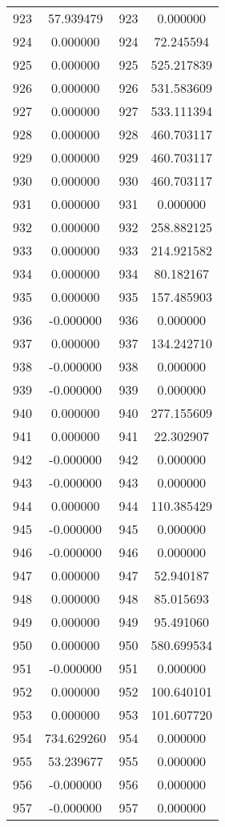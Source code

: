 \documentclass[12pt]{article}
\begin{document}
\begin{longtable}{@{}cccc@{}}
923 & 57.939479 & 923 & 0.000000 \\
924 & 0.000000 & 924 & 72.245594 \\
925 & 0.000000 & 925 & 525.217839 \\
926 & 0.000000 & 926 & 531.583609 \\
927 & 0.000000 & 927 & 533.111394 \\
928 & 0.000000 & 928 & 460.703117 \\
929 & 0.000000 & 929 & 460.703117 \\
930 & 0.000000 & 930 & 460.703117 \\
931 & 0.000000 & 931 & 0.000000 \\
932 & 0.000000 & 932 & 258.882125 \\
933 & 0.000000 & 933 & 214.921582 \\
934 & 0.000000 & 934 & 80.182167 \\
935 & 0.000000 & 935 & 157.485903 \\
936 & -0.000000 & 936 & 0.000000 \\
937 & 0.000000 & 937 & 134.242710 \\
938 & -0.000000 & 938 & 0.000000 \\
939 & -0.000000 & 939 & 0.000000 \\
940 & 0.000000 & 940 & 277.155609 \\
941 & 0.000000 & 941 & 22.302907 \\
942 & -0.000000 & 942 & 0.000000 \\
943 & -0.000000 & 943 & 0.000000 \\
944 & 0.000000 & 944 & 110.385429 \\
945 & -0.000000 & 945 & 0.000000 \\
946 & -0.000000 & 946 & 0.000000 \\
947 & 0.000000 & 947 & 52.940187 \\
948 & 0.000000 & 948 & 85.015693 \\
949 & 0.000000 & 949 & 95.491060 \\
950 & 0.000000 & 950 & 580.699534 \\
951 & -0.000000 & 951 & 0.000000 \\
952 & 0.000000 & 952 & 100.640101 \\
953 & 0.000000 & 953 & 101.607720 \\
954 & 734.629260 & 954 & 0.000000 \\
955 & 53.239677 & 955 & 0.000000 \\
956 & -0.000000 & 956 & 0.000000 \\
957 & -0.000000 & 957 & 0.000000 \\

\end{longtable}
\end{document}
